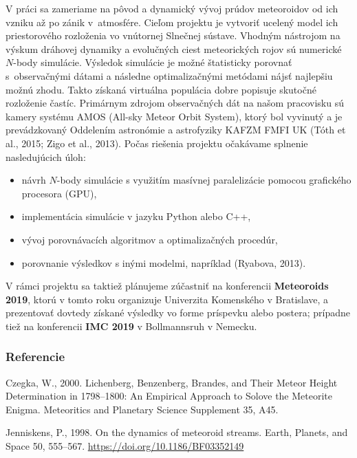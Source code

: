 V práci sa zameriame na pôvod a dynamický vývoj prúdov meteoroidov od
ich vzniku až po zánik v~atmosfére. Cieľom projektu je vytvoriť ucelený
model ich priestorového rozloženia vo vnútornej Slnečnej sústave.
Vhodným nástrojom na výskum dráhovej dynamiky a evolučných ciest
meteorických rojov sú numerické \(N\)-body simulácie. Výsledok simulácie
je možné štatisticky porovnať s~observačnými dátami a následne
optimalizačnými metódami nájsť najlepšiu možnú zhodu. Takto získaná
virtuálna populácia dobre popisuje skutočné rozloženie častíc. Primárnym
zdrojom observačných dát na našom pracovisku sú kamery systému AMOS
(All-sky Meteor Orbit System), ktorý bol vyvinutý a je prevádzkovaný
Oddelením astronómie a astrofyziky KAFZM FMFI UK (Tóth et al., 2015;
Zigo et al., 2013). Počas riešenia projektu očakávame splnenie
nasledujúcich úloh:

\begin{itemize}
\tightlist
\item
  návrh \(N\)-body simulácie s využitím masívnej paralelizácie pomocou
  grafického procesora (GPU),
\item
  implementácia simulácie v jazyku Python alebo C++,
\item
  vývoj porovnávacích algoritmov a optimalizačných procedúr,
\item
  porovnanie výsledkov s inými modelmi, napríklad (Ryabova, 2013).
\end{itemize}

V rámci projektu sa taktiež plánujeme zúčastniť na konferencii
\textbf{Meteoroids 2019}, ktorú v tomto roku organizuje Univerzita
Komenského v Bratislave, a prezentovať dovtedy získané výsledky vo forme
príspevku alebo postera; prípadne tiež na konferencii \textbf{IMC 2019}
v Bollmannsruh v Nemecku.

\subsubsection*{Referencie}\label{referencie}

\hypertarget{refs}{}
\hypertarget{ref-czegka2000}{}
Czegka, W., 2000. Lichenberg, Benzenberg, Brandes, and Their Meteor
Height Determination in 1798--1800: An Empirical Approach to Solove the
Meteorite Enigma. Meteoritics and Planetary Science Supplement 35, A45.

\hypertarget{ref-jenniskens1998}{}
Jenniskens, P., 1998. On the dynamics of meteoroid streams. Earth,
Planets, and Space 50, 555--567.
\url{https://doi.org/10.1186/BF03352149}

